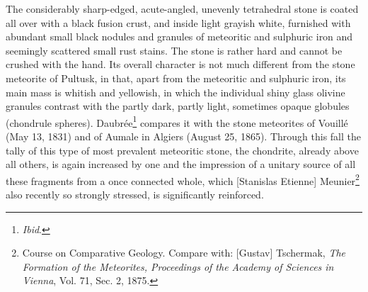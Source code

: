 \documentclass[a4paper, 12pt, oneside]{article}
\begin{document}
The considerably sharp-edged, acute-angled, unevenly tetrahedral stone is coated all over with a black fusion crust, and inside light grayish white, furnished with abundant small black nodules and granules of meteoritic and sulphuric iron and seemingly scattered small rust stains. The stone is rather hard and cannot be crushed with the hand. Its overall character is not much different from the stone meteorite of Pultusk, in that, apart from the meteoritic and sulphuric iron, its main mass is whitish and yellowish, in which the individual shiny glass olivine granules contrast with the partly dark, partly light, sometimes opaque globules (chondrule spheres). Daubrée\footnote{\emph{Ibid}.} compares it with the stone meteorites of Vouillé (May 13, 1831) and of Aumale in Algiers (August 25, 1865). Through this fall the tally of this type of most prevalent meteoritic stone, the chondrite, already above all others, is again increased by one and the impression of a unitary source of all these fragments from a once connected whole, which [Stanislas Etienne] Meunier\footnote{Course on Comparative Geology. Compare with: [Gustav] Tschermak, \emph{The Formation of the Meteorites, Proceedings of the Academy of Sciences in Vienna}, Vol. 71, Sec. 2, 1875.} also recently so strongly stressed, is significantly reinforced.
\end{document}
